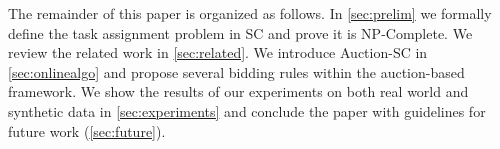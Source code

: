 
The remainder of this paper is organized as follows. In \cref{sec:prelim} we formally define the task assignment problem in SC and prove it is NP-Complete. We review the related work in \cref{sec:related}. We introduce Auction-SC in \cref{sec:onlinealgo} and propose several bidding rules within the auction-based framework. We show the results of our experiments on both real world and synthetic data in \cref{sec:experiments} and conclude the paper with guidelines for future work (\cref{sec:future}).